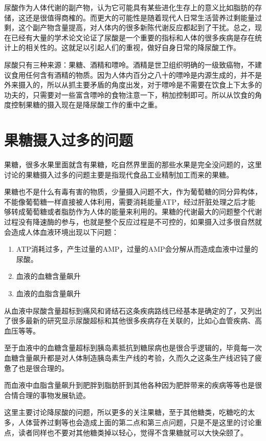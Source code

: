 \documentclass[12pt,oneside]{book}
\begin{document}
尿酸作为人体代谢的副产物，认为它可能具有某些进化生存上的意义比如脂肪的存储，这还是很值得商榷的。而更大的可能性是随着现代人日常生活营养过剩能量过剩，这个副产物含量提高，对人体内的很多新陈代谢反应都起到了干扰。总之，现在已经有大量的学术论文论证了尿酸是一个重要的指标和人体的很多疾病是存在统计上的相关性的。这就足以引起人们的重视，做好自身日常的降尿酸工作。

尿酸只有三种来源：果糖、酒精和嘌呤。酒精是世卫组织明确的一级致癌物，不建议食用任何含有酒精的物质。因为人体内百分之八十的嘌呤是内源生成的，并不是外来摄入的，所以从抓主要矛盾的角度出发，对于嘌呤是不需要在饮食上下太多的功夫的，只需要对一些富含嘌呤的食物注意一下，稍加控制即可。所以从饮食的角度控制果糖的摄入现在是降尿酸工作的重中之重。



\section{果糖摄入过多的问题}
果糖，很多水果里面就含有果糖，吃自然界里面的那些水果是完全没问题的，这里讨论的果糖摄入过多的问题主要是指现代食品工业精制加工而来的果糖。

果糖也不是什么有毒有害的物质，少量摄入问题不大，作为葡萄糖的同分异构体，不能像葡萄糖一样直接被人体利用，需要消耗能量ATP，经过肝脏处理之后才能够转成葡萄糖或者脂肪作为人体的能量来利用的。果糖的代谢最大的问题整个代谢过程没有降速酶的参与，也就是整个反应过程是不可控的，如果摄入过多很自然就会造成人体血液环境出现以下问题：

\begin{enumerate}
\item ATP消耗过多，产生过量的AMP，过量的AMP会分解从而造成血液中过量的尿酸。
\item 血液的血糖含量飙升
\item 血液的血脂含量飙升
\end{enumerate}

从血液中尿酸含量超标到痛风和肾结石这条疾病路线已经基本是确定的了，\cite{疯狂的尿酸}又列出了很多最新的研究显示尿酸超标和其他很多疾病存在关联的，比如心血管疾病、高血压等等。

至于血液中的血糖含量超标到胰岛素抵抗到糖尿病也是很合乎逻辑的，毕竟每一次血糖含量飙升都是对人体制造胰岛素生产线的考验，久而久之这条生产线迟钝了疲惫了也是很合理的。

而血液中血脂含量飙升到肥胖到脂肪肝到其他各种因为肥胖带来的疾病等等也是很合情合理的事物发展轨迹。

这里主要讨论降尿酸的问题，所以更多的关注果糖，至于其他糖类，吃糖吃的太多，人体营养过剩等也会造成上面的第二点和第三点问题，只是不是这里的讨论重点，读者同样也不要对其他糖类掉以轻心，觉得不含果糖就可以大快朵颐了。
\end{document}

